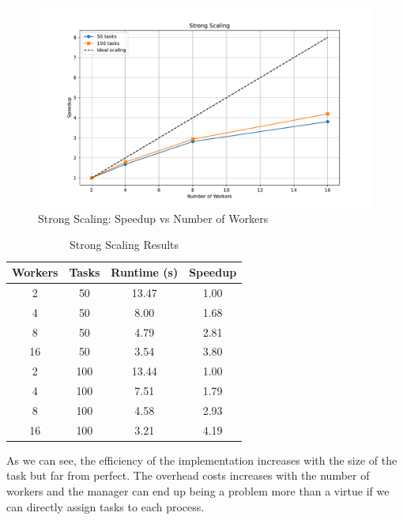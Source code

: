\documentclass[unicode,11pt,a4paper,oneside,numbers=endperiod,openany]{scrartcl}
\begin{document}
\begin{figure}[H]
  \centering
  \includegraphics[width=\textwidth]{../code/hpc_python/scaling_study.pdf}
  \caption{Strong Scaling: Speedup vs Number of Workers}
\end{figure}

\begin{table}[!ht]
  \centering
  \caption{Strong Scaling Results}
  \begin{tabular}{cccc}
  \hline
  Workers & Tasks & Runtime (s) & Speedup \\
  \hline
  2 & 50 & 13.47 & 1.00 \\
  4 & 50 & 8.00 & 1.68 \\
  8 & 50 & 4.79 & 2.81 \\
  16 & 50 & 3.54 & 3.80 \\
  \hline
  2 & 100 & 13.44 & 1.00 \\
  4 & 100 & 7.51 & 1.79 \\
  8 & 100 & 4.58 & 2.93 \\
  16 & 100 & 3.21 & 4.19 \\
  \hline
  \end{tabular}
  \end{table}

As we can see, the efficiency of the implementation increases with the size of the task but far from perfect. 
The overhead costs increases with the number of workers and the manager can end up being a problem more than a virtue if we can directly assign 
tasks to each process. 
\end{document}
